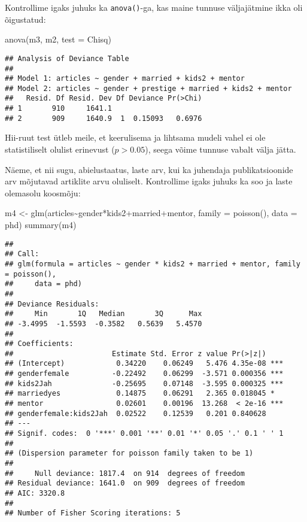 \documentclass[
]{book}
\newenvironment{Shaded}{\begin{snugshade}}{\end{snugshade}}
\newcommand{\AttributeTok}[1]{\textcolor[rgb]{0.77,0.63,0.00}{#1}}
\newcommand{\FunctionTok}[1]{\textcolor[rgb]{0.00,0.00,0.00}{#1}}
\newcommand{\NormalTok}[1]{#1}
\newcommand{\OtherTok}[1]{\textcolor[rgb]{0.56,0.35,0.01}{#1}}
\newcommand{\SpecialCharTok}[1]{\textcolor[rgb]{0.00,0.00,0.00}{#1}}
\newcommand{\StringTok}[1]{\textcolor[rgb]{0.31,0.60,0.02}{#1}}
\begin{document}
Kontrollime igaks juhuks ka \texttt{anova()}-ga, kas maine tunnuse väljajätmine ikka oli õigustatud:

\begin{Shaded}
\begin{Highlighting}[]
\FunctionTok{anova}\NormalTok{(m3, m2, }\AttributeTok{test =} \StringTok{\textquotesingle{}Chisq\textquotesingle{}}\NormalTok{)}
\end{Highlighting}
\end{Shaded}

\begin{verbatim}
## Analysis of Deviance Table
## 
## Model 1: articles ~ gender + married + kids2 + mentor
## Model 2: articles ~ gender + prestige + married + kids2 + mentor
##   Resid. Df Resid. Dev Df Deviance Pr(>Chi)
## 1       910     1641.1                     
## 2       909     1640.9  1  0.15093   0.6976
\end{verbatim}

Hii-ruut test ütleb meile, et keerulisema ja lihtsama mudeli vahel ei ole statistiliselt olulist erinevust (\(p > 0.05\)), seega võime tunnuse vabalt välja jätta.

Näeme, et nii sugu, abielustaatus, laste arv, kui ka juhendaja publikatsioonide arv mõjutavad artiklite arvu oluliselt. Kontrollime igaks juhuks ka soo ja laste olemasolu koosmõju:

\begin{Shaded}
\begin{Highlighting}[]
\NormalTok{m4 }\OtherTok{\textless{}{-}} \FunctionTok{glm}\NormalTok{(articles}\SpecialCharTok{\textasciitilde{}}\NormalTok{gender}\SpecialCharTok{*}\NormalTok{kids2}\SpecialCharTok{+}\NormalTok{married}\SpecialCharTok{+}\NormalTok{mentor, }\AttributeTok{family =} \FunctionTok{poisson}\NormalTok{(), }\AttributeTok{data =}\NormalTok{ phd)}
\FunctionTok{summary}\NormalTok{(m4)}
\end{Highlighting}
\end{Shaded}

\begin{verbatim}
## 
## Call:
## glm(formula = articles ~ gender * kids2 + married + mentor, family = poisson(), 
##     data = phd)
## 
## Deviance Residuals: 
##     Min       1Q   Median       3Q      Max  
## -3.4995  -1.5593  -0.3582   0.5639   5.4570  
## 
## Coefficients:
##                       Estimate Std. Error z value Pr(>|z|)    
## (Intercept)            0.34220    0.06249   5.476 4.35e-08 ***
## genderfemale          -0.22492    0.06299  -3.571 0.000356 ***
## kids2Jah              -0.25695    0.07148  -3.595 0.000325 ***
## marriedyes             0.14875    0.06291   2.365 0.018045 *  
## mentor                 0.02601    0.00196  13.268  < 2e-16 ***
## genderfemale:kids2Jah  0.02522    0.12539   0.201 0.840628    
## ---
## Signif. codes:  0 '***' 0.001 '**' 0.01 '*' 0.05 '.' 0.1 ' ' 1
## 
## (Dispersion parameter for poisson family taken to be 1)
## 
##     Null deviance: 1817.4  on 914  degrees of freedom
## Residual deviance: 1641.0  on 909  degrees of freedom
## AIC: 3320.8
## 
## Number of Fisher Scoring iterations: 5
\end{verbatim}
\end{document}
